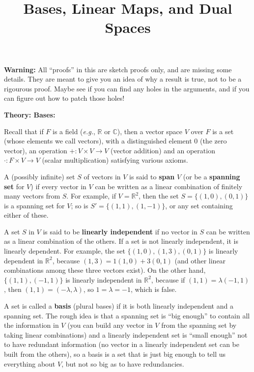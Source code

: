 \documentclass{article}
\begin{document}
\title{Bases, Linear Maps, and Dual Spaces}
\date{}

\maketitle
\thispagestyle{empty}

\Large





\textbf{Warning:} All ``proofs'' in this are sketch proofs only, and are missing some details. They are meant to give you an idea of why a result is true, not to be a rigourous proof. Maybe see if you can find any holes in the arguments, and if you can figure out how to patch those holes!

\vspace{5mm}









\textbf{Theory: Bases:}\bigskip


Recall that if $F$ is a field (\textit{e.g.}, $\mathbb{R}$ or $\mathbb{C}$), then a vector space $V$ over $F$ is a set (whose elements we call vectors), with a distinguished element 0 (the zero vector), an operation $+:V\times V \to V$ (vector addition) and an operation $\cdot:F\times V\to V$ (scalar multiplication) satisfying various axioms.

A (possibly infinite) set $S$ of vectors in $V$ is said to \textbf{span} $V$ (or be a \textbf{spanning set} for $V$) if every vector in $V$ can be written as a linear combination of finitely many vectors from $S$. For example, if $V=\mathbb{R}^2$, then the set $S=\{(1,0),(0,1)\}$ is a spanning set for $V$; so is $S'=\{(1,1),(1,-1)\}$, or any set containing either of these.

A set $S$ in $V$ is said to be \textbf{linearly independent} if no vector in $S$ can be written as a linear combination of the others. If a set is not linearly independent, it is linearly dependent. For example, the set $\{(1,0),(1,3),(0,1)\}$ is linearly dependent in $\mathbb{R}^2$, because $(1,3)=1(1,0)+3(0,1)$ (and other linear combinations among these three vectors exist). On the other hand, $\{(1,1),(-1,1)\}$ is linearly independent in $\mathbb{R}^2$, because if $(1,1)=\lambda (-1,1)$, then $(1,1)=(-\lambda,\lambda)$, so $1=\lambda=-1$, which is false.

A set is called a \textbf{basis} (plural bases) if it is both linearly independent and a spanning set. The rough idea is that a spanning set is ``big enough'' to contain all the information in $V$ (you can build any vector in $V$ from the spanning set by taking linear combinations) and a linearly independent set is ``small enough'' not to have redundant information (no vector in a linearly independent set can be built from the others), so a basis is a set that is just big enough to tell us everything about $V$, but not so big as to have redundancies.\medskip
\end{document}
